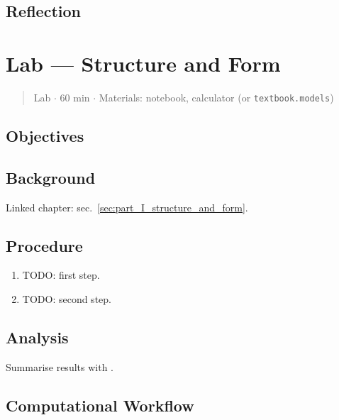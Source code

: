 \documentclass[
]{article}
\theoremstyle{plain}
\theoremstyle{definition}
\begin{document}
\subsection{Reflection}\label{reflection-4}

\newpage

\section{Lab --- Structure and
Form}\label{sec:lab_part_I_structure_and_form}

\begin{quote}
Lab \texorpdfstring{\ensuremath{\cdot}}{.} 60 min \texorpdfstring{\ensuremath{\cdot}}{.} Materials: notebook, calculator (or
\texttt{textbook.models})
\end{quote}

\subsection{Objectives}\label{objectives-5}

\subsection{Background}\label{background-5}

Linked chapter: sec.~\ref{sec:part_I_structure_and_form}.

\subsection{Procedure}\label{procedure-5}

\begin{enumerate}
\def\labelenumi{\arabic{enumi}.}
\item
  TODO: first step.
\item
  TODO: second step.
\end{enumerate}

\subsection{Analysis}\label{analysis-5}

Summarise results with .

\subsection{Computational Workflow}\label{computational-workflow-5}
\end{document}
